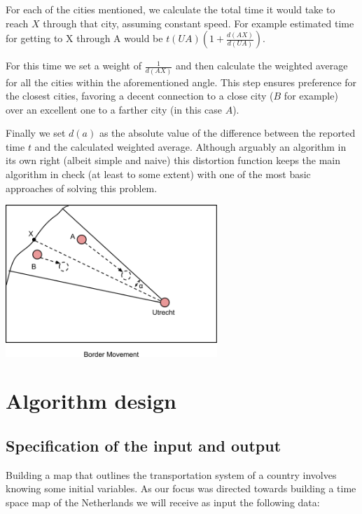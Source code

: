 \documentclass[a4paper,11pt]{article}
\begin{document}
\begin{enumerate}[(i)]
      For each of the cities mentioned, we calculate the total time it
      would take to reach $X$ through that city, assuming constant
      speed. For example estimated time for getting to X through A
      would be $t(UA)(1 + \frac{d(AX)}{d(UA)})$.

      For this time we set a weight of $\frac{1}{d(AX)}$ and then calculate the
      weighted average for all the cities within the aforementioned
      angle. This step ensures preference for the closest cities,
      favoring a decent connection to a close city ($B$ for example)
      over an excellent one to a farther city (in this case $A$).

      Finally we set $d(a)$ as the absolute value of the difference
      between the reported time $t$ and the calculated weighted
      average. Although arguably an algorithm in its own right (albeit
      simple and naive) this distortion function keeps the main
      algorithm in check (at least to some extent) with one of the
      most basic approaches of solving this problem.

    \begin{center}
        \includegraphics[width=0.6\textwidth]{quant7.png}
    \end{center}
\end{enumerate}

\section{Algorithm design}

\subsection{Specification of the input and output}

Building a map that outlines the transportation system of a country involves knowing some initial variables. As our focus was directed towards building a time space map of the Netherlands we will receive as input the following data:
\end{document}
